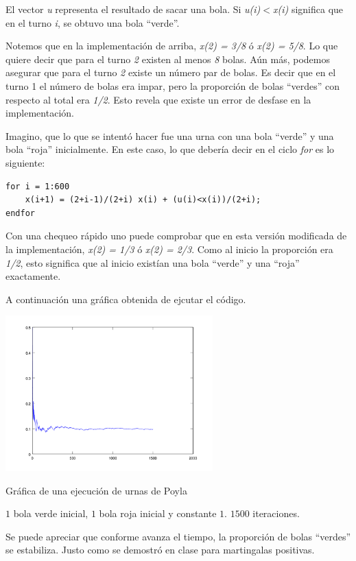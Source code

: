 El vector \textsl{u} representa el resultado de sacar una bola. Si \textsl{u(i)$<$x(i)} significa que en el turno \textsl{i}, 
se obtuvo una bola ``verde''.\par\null

Notemos que en la implementación de arriba, \textsl{x(2) = 3/8} ó \textsl{x(2) = 5/8}. Lo que quiere decir que para 
el turno \textsl{2} existen al menos \textsl{8} bolas. Aún más, podemos asegurar que para el turno \textsl{2} existe 
un número par de bolas. Es decir que en el turno 1 el número de bolas era impar, pero la proporción de bolas ``verdes'' 
con respecto al total era \textsl{1/2}. Esto revela que existe un error de desfase en la implementación.\par\null 

Imagino, que lo que se intentó hacer fue una urna con una bola ``verde'' y una bola ``roja'' inicialmente. En este caso, lo que 
debería decir en el ciclo \textsl{for} es lo siguiente:\par\null

\begin{verbatim}
for i = 1:600
    x(i+1) = (2+i-1)/(2+i) x(i) + (u(i)<x(i))/(2+i);
endfor
\end{verbatim}\par\null

Con una chequeo rápido uno puede comprobar que en esta versión modificada de la implementación, \textsl{x(2) = 1/3} ó \textsl{x(2) = 2/3}. 
Como al inicio la proporción era \textsl{1/2}, esto significa que al inicio existían una bola ``verde'' y una ``roja'' exactamente.\par\null

A continuación una gráfica obtenida de ejcutar el código.

\begin{center}
    \includegraphics[width=8cm]{tarea2/problema2_2/poyla.PNG}
\end{center}
\begin{center}
    Gráfica de una ejecución de urnas de Poyla \par
    $1$ bola verde inicial, $1$ bola roja inicial y constante $1$. $1500$ iteraciones.
\end{center}\par\null

Se puede apreciar que conforme avanza el tiempo, la proporción de bolas ``verdes'' se estabiliza. Justo como se demostró en clase para
martingalas positivas.